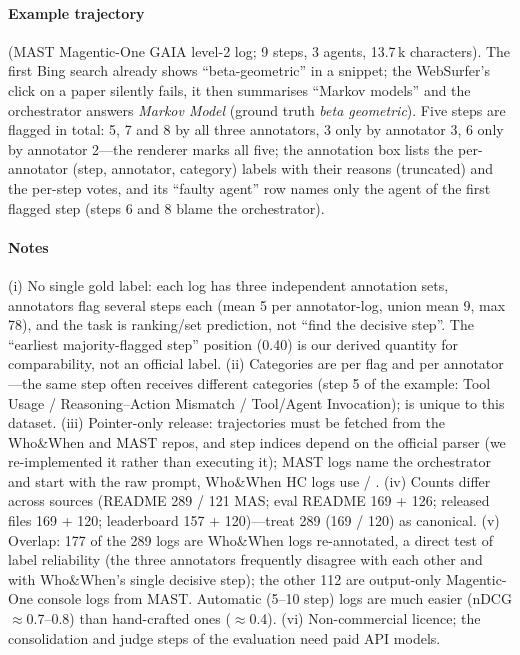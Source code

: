 \paragraph{Example trajectory}  (MAST Magentic-One GAIA level-2 log; 9 steps, 3 agents, 13.7\,k characters). The first Bing search already shows ``beta-geometric'' in a snippet; the WebSurfer's click on a paper silently fails, it then summarises ``Markov models'' and the orchestrator answers \emph{Markov Model} (ground truth \emph{beta geometric}). Five steps are flagged in total: 5, 7 and 8 by all three annotators, 3 only by annotator 3, 6 only by annotator 2---the renderer marks all five; the annotation box lists the per-annotator (step, annotator, category) labels with their reasons (truncated) and the per-step votes, and its ``faulty agent'' row names only the agent of the first flagged step (steps 6 and 8 blame the orchestrator).


\paragraph{Notes} (i) No single gold label: each log has three independent annotation sets, annotators flag several steps each (mean 5 per annotator-log, union mean 9, max 78), and the task is ranking/set prediction, not ``find the decisive step''. The ``earliest majority-flagged step'' position (0.40) is our derived quantity for comparability, not an official label. (ii) Categories are per flag and per annotator---the same step often receives different categories (step 5 of the example: Tool Usage / Reasoning--Action Mismatch / Tool/Agent Invocation);  is unique to this dataset. (iii) Pointer-only release: trajectories must be fetched from the Who\&When and MAST repos, and step indices depend on the official parser (we re-implemented it rather than executing it); MAST logs name the orchestrator  and start with the raw  prompt, Who\&When HC logs use  / . (iv) Counts differ across sources (README 289 / 121 MAS; eval README 169 + 126; released files 169 + 120; leaderboard 157 + 120)---treat 289 (169 / 120) as canonical. (v) Overlap: 177 of the 289 logs are Who\&When logs re-annotated, a direct test of label reliability (the three annotators frequently disagree with each other and with Who\&When's single decisive step); the other 112 are output-only Magentic-One console logs from MAST. Automatic (5--10 step) logs are much easier (nDCG $\approx$0.7--0.8) than hand-crafted ones ($\approx$0.4). (vi) Non-commercial licence; the consolidation and judge steps of the evaluation need paid API models.
